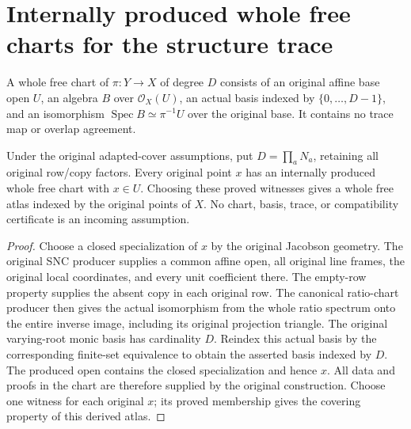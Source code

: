 \section{Internally produced whole free charts for the structure trace}

\begin{definition}
\label{def:kn-structure-trace-whole-free-chart}
\leanok
A whole free chart of $\pi:Y\to X$ of degree $D$ consists of an
original affine base open $U$, an algebra $B$ over $\mathcal O_X(U)$,
an actual basis indexed by $\{0,\ldots,D-1\}$, and an isomorphism
$\operatorname{Spec}B\simeq\pi^{-1}U$ over the original base.
It contains no trace map or overlap agreement.
\end{definition}

\begin{theorem}
\label{thm:kn-structure-trace-produced-whole-free-chart}
\leanok
Under the original adapted-cover assumptions, put
$D=\prod_a N_a$, retaining all original row/copy factors. Every
original point $x$ has an internally produced whole free chart with
$x\in U$. Choosing these proved witnesses gives a whole free atlas
indexed by the original points of $X$. No chart, basis, trace, or
compatibility certificate is an incoming assumption.
\end{theorem}
\begin{proof}
Choose a closed specialization of $x$ by the original Jacobson
geometry. The original SNC producer supplies a common affine open,
all original line frames, the original local coordinates, and every
unit coefficient there. The empty-row property supplies the absent
copy in each original row. The canonical ratio-chart producer then
gives the actual isomorphism from the whole ratio spectrum onto the
entire inverse image, including its original projection triangle.
The original varying-root monic basis has cardinality $D$. Reindex
this actual basis by the corresponding finite-set equivalence to
obtain the asserted basis indexed by $D$. The produced open contains
the closed specialization and hence $x$. All data and proofs in the
chart are therefore supplied by the original construction. Choose
one witness for each original $x$; its proved membership gives the
covering property of this derived atlas.
\end{proof}
